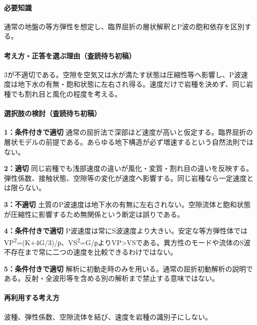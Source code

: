 \paragraph{必要知識} 通常の地盤の等方弾性を想定し、臨界屈折の層状解釈とP波の飽和依存を区別する。

\paragraph{考え方・正答を選ぶ理由（査読待ち初稿）} 3が不適切である。空隙を空気又は水が満たす状態は圧縮性等へ影響し、P波速度は地下水の有無・飽和状態に左右され得る。速度だけで岩種を決めず、同じ岩種でも割れ目と風化の程度を考える。

\paragraph{選択肢の検討（査読待ち初稿）}\mbox{}\par

\noindent\textbf{1：条件付きで適切} 通常の屈折法で深部ほど速度が高いと仮定する。臨界屈折の層状モデルの前提である。あらゆる地下構造が必ず増速するという自然法則ではない。\par

\noindent\textbf{2：適切} 同じ岩種でも浅部速度の違いが風化・変質・割れ目の違いを反映する。弾性係数、接触状態、空隙等の変化が速度へ影響する。同じ岩種なら一定速度とは限らない。\par

\noindent\textbf{3：不適切} 土質のP波速度は地下水の有無に左右されない。空隙流体と飽和状態が圧縮性に影響するため無関係という断定は誤りである。\par

\noindent\textbf{4：条件付きで適切} P波速度は常にS波速度より大きい。安定な等方弾性体ではVP\textsuperscript{2}=(K+4G/3)/ρ、VS\textsuperscript{2}=G/ρよりVP>VSである。異方性のモードや流体のS波不存在まで常に二つの速度を比較できるわけではない。\par

\noindent\textbf{5：条件付きで適切} 解析に初動走時のみを用いる。通常の屈折初動解析の説明である。反射・全波形等を含める別の解析まで禁止する意味ではない。\par

\paragraph{再利用する考え方} 波種、弾性係数、空隙流体を結び、速度を岩種の識別子にしない。

